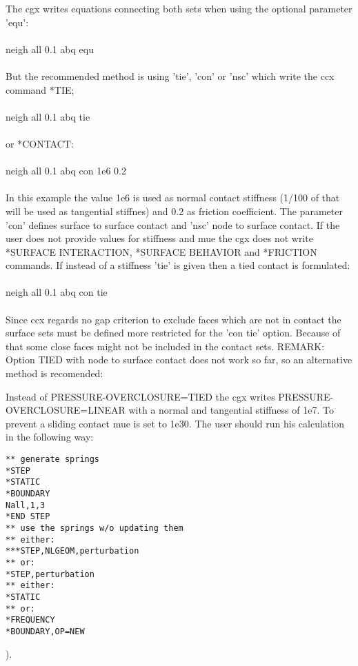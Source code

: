 \documentclass{article}
\begin{document}
The cgx writes equations connecting both sets when using the optional parameter 'equ':\\\\ neigh all 0.1 abq equ\\\\But the recommended method is using 'tie', 'con' or 'nsc' which write the ccx command *TIE;\\\\ neigh all 0.1 abq tie\\\\or *CONTACT:\\\\ neigh all 0.1 abq con 1e6 0.2\\\\In this example the value 1e6 is used as normal contact stiffness (1/100 of that will be used as tangential stiffnes) and 0.2 as friction coefficient. The parameter 'con' defines surface to surface contact and 'nsc' node to surface contact. If the user does not provide values for stiffness and mue the cgx does not write *SURFACE INTERACTION, *SURFACE BEHAVIOR and *FRICTION commands. If instead of a stiffness 'tie' is given then a tied contact is formulated:\\\\ neigh all 0.1 abq con tie\\\\Since ccx regards no gap criterion to exclude faces which are not in contact the surface sets must be defined more restricted for the 'con tie' option. Because of that some close faces might not be included in the contact sets. REMARK: Option TIED with node to surface contact does not work so far, so an alternative method is recomended:

Instead of PRESSURE-OVERCLOSURE=TIED the cgx writes PRESSURE-OVERCLOSURE=LINEAR with a normal and tangential stiffness of 1e7. To prevent a sliding contact mue is set to 1e30. The user should run his calculation in the following way:
\begin{verbatim}
** generate springs
*STEP                      
*STATIC                    
*BOUNDARY                  
Nall,1,3                   
*END STEP
** use the springs w/o updating them                  
** either:
***STEP,NLGEOM,perturbation       
** or:                   
*STEP,perturbation  
** either:
*STATIC                    
** or:                   
*FREQUENCY                 
*BOUNDARY,OP=NEW           
\end{verbatim}
).
\end{document}
